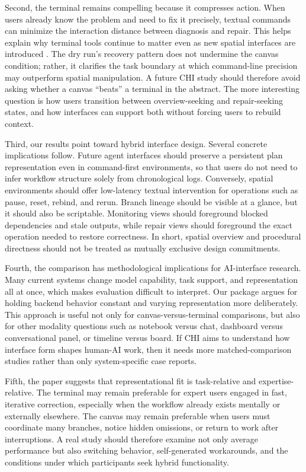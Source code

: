 \documentclass[sigconf]{acmart}
\begin{document}
Second, the terminal remains compelling because it compresses action. When users already know the problem and need to fix it precisely, textual commands can minimize the interaction distance between diagnosis and repair. This helps explain why terminal tools continue to matter even as new spatial interfaces are introduced \cite{demasi2026terminal}. The dry run's recovery pattern does not undermine the canvas condition; rather, it clarifies the task boundary at which command-line precision may outperform spatial manipulation. A future CHI study should therefore avoid asking whether a canvas ``beats'' a terminal in the abstract. The more interesting question is how users transition between overview-seeking and repair-seeking states, and how interfaces can support both without forcing users to rebuild context.

Third, our results point toward hybrid interface design. Several concrete implications follow. Future agent interfaces should preserve a persistent plan representation even in command-first environments, so that users do not need to infer workflow structure solely from chronological logs. Conversely, spatial environments should offer low-latency textual intervention for operations such as pause, reset, rebind, and rerun. Branch lineage should be visible at a glance, but it should also be scriptable. Monitoring views should foreground blocked dependencies and stale outputs, while repair views should foreground the exact operation needed to restore correctness. In short, spatial overview and procedural directness should not be treated as mutually exclusive design commitments.

Fourth, the comparison has methodological implications for AI-interface research. Many current systems change model capability, task support, and representation all at once, which makes evaluation difficult to interpret. Our package argues for holding backend behavior constant and varying representation more deliberately. This approach is useful not only for canvas-versus-terminal comparisons, but also for other modality questions such as notebook versus chat, dashboard versus conversational panel, or timeline versus board. If CHI aims to understand how interface form shapes human-AI work, then it needs more matched-comparison studies rather than only system-specific case reports.

Fifth, the paper suggests that representational fit is task-relative and expertise-relative. The terminal may remain preferable for expert users engaged in fast, iterative correction, especially when the workflow already exists mentally or externally elsewhere. The canvas may remain preferable when users must coordinate many branches, notice hidden omissions, or return to work after interruptions. A real study should therefore examine not only average performance but also switching behavior, self-generated workarounds, and the conditions under which participants seek hybrid functionality.
\end{document}
